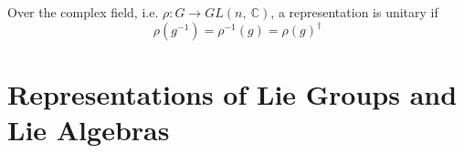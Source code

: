     \begin{definition}
        Over the complex field, i.e. $\rho \colon G \rightarrow GL(n, ~\mathbb C)$, a representation is unitary if 
        \begin{equation*}
            \rho(g^{-1}) = \rho^{-1}(g) = \rho(g)^{\dagger}
        \end{equation*}
    \end{definition}

    \section{Representations of Lie Groups and Lie Algebras}

    